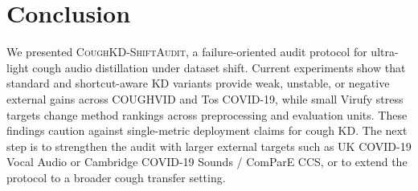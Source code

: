 \section{Conclusion}

We presented \textsc{CoughKD-ShiftAudit}, a failure-oriented audit protocol for ultra-light cough audio distillation under dataset shift. Current experiments show that standard and shortcut-aware KD variants provide weak, unstable, or negative external gains across COUGHVID and Tos COVID-19, while small Virufy stress targets change method rankings across preprocessing and evaluation units. These findings caution against single-metric deployment claims for cough KD. The next step is to strengthen the audit with larger external targets such as UK COVID-19 Vocal Audio or Cambridge COVID-19 Sounds / ComParE CCS, or to extend the protocol to a broader cough transfer setting.
